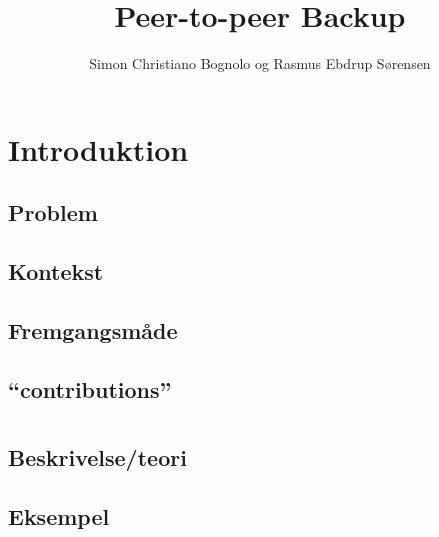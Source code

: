 

\usepackage{biblatex}

\title{Peer-to-peer Backup}
\author{Simon Christiano Bognolo og Rasmus Ebdrup Sørensen}



\frontmatter


\tableofcontents*
\normalsize
\newpage

\listoffixmes
 \newpage
\lstlistoflistings
 \newpage

\savepagenumber
\mainmatter

\linespread{1.5}
\selectfont 
\chapter{Introduktion}
  \section{Problem}	 
  \section{Kontekst}
  \section{Fremgangsmåde}
  \section{``contributions''}

\chapter{\ds}
  \section{Beskrivelse/teori}
  \section{Eksempel}
